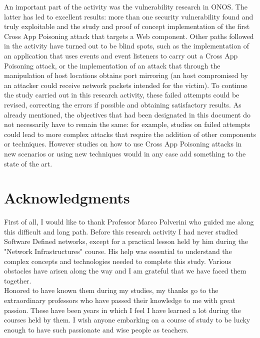 \documentclass[a4paper,10pt]{memoir}
\begin{document}
{%
An important part of the activity was the vulnerability research in ONOS. The latter has led to excellent results: more than one security vulnerability found and truly exploitable and the study and proof of concept implementation of the first Cross App Poisoning attack that targets a Web component. Other paths followed in the activity have turned out to be blind spots, such as the implementation of an application that uses events and event listeners to carry out a Cross App Poisoning attack, or the implementation of an attack that through the manipulation of host locations obtains port mirroring (an host compromised by an attacker could receive network packets intended for the victim). To continue the study carried out in this research activity, these failed attempts could be revised, correcting the errors if possible and obtaining satisfactory results. As already mentioned, the objectives that had been designated in this document do not necessarily have to remain the same: for example, studies on failed attempts could lead to more complex attacks that require the addition of other components or techniques. However studies on how to use Cross App Poisoning attacks in new scenarios or using new techniques would in any case add something to the state of the art.


\clearpage



\chapter*{Acknowledgments}

First of all, I would like to thank Professor Marco Polverini who guided me along this difficult and long path. Before this research activity I had never studied Software Defined networks, except for a practical lesson held by him during the "Network Infrastructures" course. His help was essential to understand the complex concepts and technologies needed to complete this study. Various obstacles have arisen along the way and I am grateful that we have faced them together.\\

Honored to have known them during my studies, my thanks go to the extraordinary professors who have passed their knowledge to me with great passion. These have been years in which I feel I have learned a lot during the courses held by them. I wish anyone embarking on a course of study to be lucky enough to have such passionate and wise people as teachers.\\

}
\end{document}

